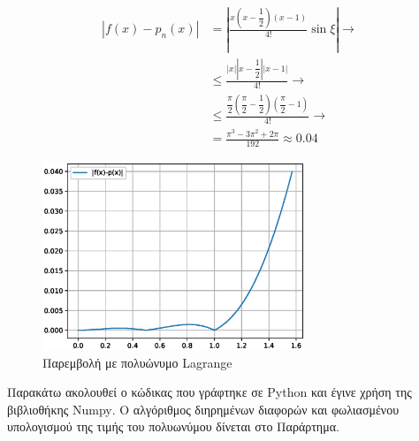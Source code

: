 \documentclass[assignment3.tex]{subfiles}
\begin{document}
\begin{equation}
\begin{split}
|f(x)-p_n(x)|&=\left|\frac{x(x-\dfrac{1}{2})(x-1)}{4!}\sin\xi\right| \rightarrow \\
&\leq \frac{|x||x-\dfrac{1}{2}||x-1|}{4!}\rightarrow \\
& \leq \frac{\dfrac{\pi}{2} (\dfrac{\pi}{2}-\dfrac{1}{2})(\dfrac{\pi}{2}-1)}{4!} \rightarrow \\
&=\frac{\pi^3-3\pi^2+2\pi}{192} \approx 0.04
\end{split}
\label{eq:actual_error}
\end{equation}

\begin{figure}[hp]
	\includegraphics[width=0.7\textwidth]{ex2_error.eps}
	\centering
	\caption{Παρεμβολή με πολυώνυμο \textlatin{Lagrange}}
	\label{fig:ex2_error}
\end{figure}

Παρακάτω ακολουθεί ο κώδικας που γράφτηκε σε \textlatin{Python} και έγινε χρήση της βιβλιοθήκης \textlatin{Numpy}. Ο αλγόριθμος διηρημένων διαφορών και φωλιασμένου υπολογισμού της τιμής του πολυωνύμου δίνεται στο Παράρτημα.

\end{document}
